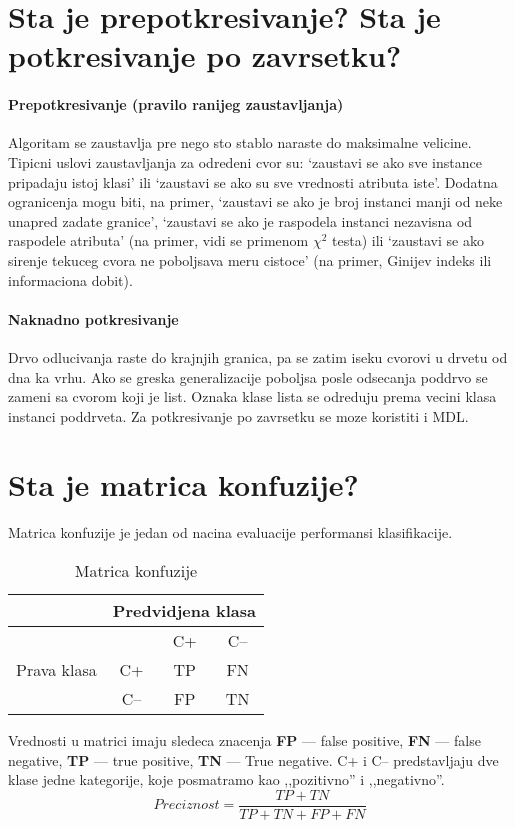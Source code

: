 \documentclass[a4paper]{article}
\begin{document}
\section{Sta je prepotkresivanje? Sta je potkresivanje po zavrsetku?}
\paragraph{Prepotkresivanje (pravilo ranijeg zaustavljanja)} Algoritam se zaustavlja pre nego sto
stablo naraste do maksimalne velicine. Tipicni uslovi zaustavljanja za odredeni cvor su: `zaustavi
se ako sve instance pripadaju istoj klasi' ili `zaustavi se ako su sve vrednosti atributa iste'.
Dodatna ogranicenja mogu biti, na primer, `zaustavi se ako je broj instanci manji od neke unapred
zadate granice', `zaustavi se ako je raspodela instanci nezavisna od raspodele atributa' (na primer,
vidi se primenom \(\chi^2\) testa) ili `zaustavi se ako sirenje tekuceg cvora ne poboljsava meru
cistoce' (na primer, Ginijev indeks ili informaciona dobit).

\paragraph{Naknadno potkresivanje} Drvo odlucivanja raste do krajnjih granica, pa se zatim iseku
cvorovi u drvetu od dna ka vrhu.  Ako se greska generalizacije poboljsa posle odsecanja poddrvo se
zameni sa cvorom koji je list.  Oznaka klase lista se odreduju prema vecini klasa instanci
poddrveta. Za potkresivanje po zavrsetku se moze koristiti i MDL.

\section{Sta je matrica konfuzije?}
Matrica konfuzije je jedan od nacina evaluacije performansi klasifikacije.
\begin{table}[htbp]
\centering
\begin{tabular}{|c|c|c|c|}
    \hline
    & \multicolumn{3}{|c|}{Predvidjena klasa} \\ \hline
    \multirow{ 3}{*}{Prava klasa} & & C+ & C-- \\ 
    & C+ & TP & FN \\ 
    & C-- & FP & TN \\ \hline
\end{tabular}
\caption{Matrica konfuzije}
\end{table}
Vrednosti u matrici imaju sledeca znacenja \textbf{FP} --- false positive, \textbf{FN} --- false
negative, \textbf{TP} --- true positive, \textbf{TN} --- True negative. C+ i C-- predstavljaju dve
klase jedne kategorije, koje posmatramo kao ,,pozitivno'' i ,,negativno''.
\[
    Preciznost = \dfrac{TP + TN}{TP + TN + FP + FN}
\]
\end{document}
